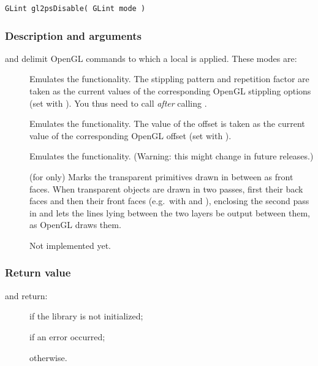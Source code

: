 \begin{verbatim}
GLint gl2psDisable( GLint mode )
\end{verbatim}

\subsubsection{Description and arguments}

 and  delimit OpenGL commands to which a local
 is applied. These modes are:

\begin{description}
\item[] Emulates the 
  functionality. The stippling pattern and repetition factor are taken
  as the current values of the corresponding OpenGL stippling options
  (set with ). You thus need to call
   \emph{after} calling
  .
\item[] Emulates the
   functionality. The value of the offset is
  taken as the current value of the corresponding OpenGL offset (set with
  ).
\item[] Emulates the  functionality.
  (Warning: this might change in future releases.)
\item[] (for  only) Marks the
  transparent primitives drawn in between as front faces. When transparent
  objects are drawn in two passes, first their back faces and then their
  front faces (e.g.\ with  and ),
  enclosing the second pass in  and
   lets the lines lying between the two
  layers be output between them, as OpenGL draws them.
\item[] Not implemented yet.
\end{description}

\subsubsection{Return value}

\noindent{} and  return:
\begin{description}
\item[] if the library is not initialized;
\item[] if an error occurred;
\item[] otherwise.
\end{description}

